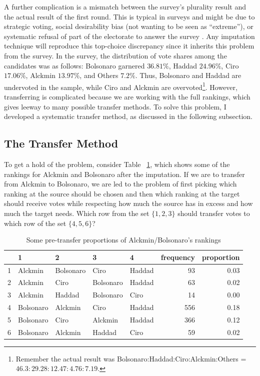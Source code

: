 \documentclass[hidelinks,11pt]{article} \usepackage[utf8]{inputenc}
\begin{document}
A further complication is a mismatch between the survey's plurality result and the actual result of the first round. This is typical in surveys and might be due to strategic voting, social desirability bias (not wanting to be seen as ``extreme''), or systematic refusal of part of the electorate to answer the survey \parencite{nishimura2016alternative}. Any imputation technique will reproduce this top-choice discrepancy since it inherits this problem from the survey. In the survey, the distribution of vote shares among the candidates was as follows: Bolsonaro garnered \(36.81\%\), Haddad \(24.96\%\), Ciro \(17.06\%\), Alckmin \(13.97\%\), and Others \(7.2\%\). Thus, Bolsonaro and Haddad are undervoted in the sample, while Ciro and Alckmin are overvoted\footnote{Remember the actual result was Bolsonaro:Haddad:Ciro:Alckmin:Others = \(46.3 : 29.28 : 12.47 : 4.76 : 7.19 \).}. However, transferring is complicated because we are working with the full rankings, which gives leeway to many possible transfer methods. To solve this problem, I developed a systematic transfer method, as discussed in the following subsection.

\subsection{The Transfer Method}
To get a hold of the problem,  consider Table ~\ref{tbl:overunderex}, which shows some of the rankings for Alckmin and Bolsonaro after the imputation. If we are to transfer from Alckmin to Bolsonaro, we are led to the problem of first picking which ranking at the source should be chosen and then which ranking at the target should receive votes while respecting how much the source has in excess and how much the target needs. Which row from the set \(\{1,2,3\}\) should transfer votes to which row of the set \(\{4,5,6\}\)?

\begin{table}[!h] \centering %
\begin{tabular}{rllllrr} \hline & 1 & 2 & 3 & 4 & frequency & proportion \\
\hline 1 & Alckmin & Bolsonaro & Ciro & Haddad & 93 & 0.03 \\ 2 & Alckmin & Ciro
& Bolsonaro & Haddad & 63 & 0.02 \\ 3 & Alckmin & Haddad & Bolsonaro & Ciro & 14
& 0.00 \\ 4 & Bolsonaro & Alckmin & Ciro & Haddad & 556 & 0.18 \\ 5 & Bolsonaro
& Ciro & Alckmin & Haddad & 366 & 0.12 \\ 6 & Bolsonaro & Alckmin & Haddad &
Ciro & 59 & 0.02 \\ \hline
\end{tabular} %
\caption{Some pre-transfer proportions of Alckmin/Bolsonaro's rankings}
\label{tbl:overunderex}
\end{table}
\end{document}
